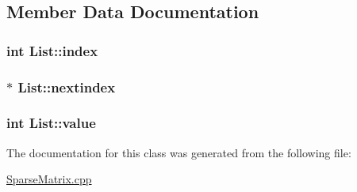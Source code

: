 \subsection{Member Data Documentation}
\subsubsection[{\texorpdfstring{index}{index}}]{\setlength{\rightskip}{0pt plus 5cm}int List\+::index\hspace{0.3cm}{\ttfamily [private]}}\hypertarget{classList_abfa64c9cd203a37cf5396b56777c8fc9}{}\label{classList_abfa64c9cd203a37cf5396b56777c8fc9}
\subsubsection[{\texorpdfstring{nextindex}{nextindex}}]{$\ast$ List\+::nextindex\hspace{0.3cm}{\ttfamily [private]}}\hypertarget{classList_a09744c906650fff0fc8ca5130fd717b1}{}\label{classList_a09744c906650fff0fc8ca5130fd717b1}
\subsubsection[{\texorpdfstring{value}{value}}]{\setlength{\rightskip}{0pt plus 5cm}int List\+::value\hspace{0.3cm}{\ttfamily [private]}}\hypertarget{classList_a481a3c1548a0e45daad6f2721f88c999}{}\label{classList_a481a3c1548a0e45daad6f2721f88c999}


The documentation for this class was generated from the following file\+:\begin{DoxyCompactItemize}
\item 
\hyperlink{SparseMatrix_8cpp}{Sparse\+Matrix.\+cpp}\end{DoxyCompactItemize}
